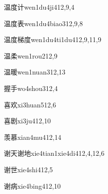 \begin{verbete}{温度计}{wen1du4ji4}{12,9,4}
\end{verbete}

\begin{verbete}{温度表}{wen1du4biao3}{12,9,8}
\end{verbete}

\begin{verbete}{温度梯度}{wen1du4ti1du4}{12,9,11,9}
\end{verbete}

\begin{verbete}{温柔}{wen1rou2}{12,9}
\end{verbete}

\begin{verbete}{温暖}{wen1nuan3}{12,13}
\end{verbete}

\begin{verbete}{握手}{wo4shou3}{12,4}
\end{verbete}

\begin{verbete}{喜欢}{xi3huan5}{12,6}
\end{verbete}

\begin{verbete}{喜剧}{xi3ju4}{12,10}
\end{verbete}

\begin{verbete}{羡慕}{xian4mu4}{12,14}
\end{verbete}

\begin{verbete}{谢天谢地}{xie4tian1xie4di4}{12,4,12,6}
\end{verbete}

\begin{verbete}{谢世}{xie4shi4}{12,5}
\end{verbete}

\begin{verbete}{谢病}{xie4bing4}{12,10}
\end{verbete}

